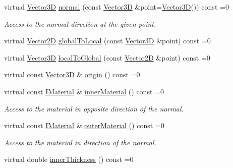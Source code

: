 \begin{DoxyCompactItemize}
\item 
virtual \hyperlink{class_d_d_surfaces_1_1_vector3_d}{Vector3D} \hyperlink{class_d_d_surfaces_1_1_i_surface_abbead4b1af2864d6d3f61270543310a0}{normal} (const \hyperlink{class_d_d_surfaces_1_1_vector3_d}{Vector3D} \&point=\hyperlink{class_d_d_surfaces_1_1_vector3_d}{Vector3D}()) const =0
\begin{DoxyCompactList}\small\item\em Access to the normal direction at the given point. \item\end{DoxyCompactList}\item 
virtual \hyperlink{class_d_d_surfaces_1_1_vector2_d}{Vector2D} \hyperlink{class_d_d_surfaces_1_1_i_surface_a0d6db86d4871584a9e72ac6018229737}{globalToLocal} (const \hyperlink{class_d_d_surfaces_1_1_vector3_d}{Vector3D} \&point) const =0
\item 
virtual \hyperlink{class_d_d_surfaces_1_1_vector3_d}{Vector3D} \hyperlink{class_d_d_surfaces_1_1_i_surface_a39651d79f7969ac7402a6e2cfc37803c}{localToGlobal} (const \hyperlink{class_d_d_surfaces_1_1_vector2_d}{Vector2D} \&point) const =0
\item 
virtual const \hyperlink{class_d_d_surfaces_1_1_vector3_d}{Vector3D} \& \hyperlink{class_d_d_surfaces_1_1_i_surface_a552cf76ca76154d0a6d9709d826b57f4}{origin} () const =0
\item 
virtual const \hyperlink{class_d_d_surfaces_1_1_i_material}{IMaterial} \& \hyperlink{class_d_d_surfaces_1_1_i_surface_a18942d2f0ea7478506765a50fa44d5e3}{innerMaterial} () const =0
\begin{DoxyCompactList}\small\item\em Access to the material in opposite direction of the normal. \item\end{DoxyCompactList}\item 
virtual const \hyperlink{class_d_d_surfaces_1_1_i_material}{IMaterial} \& \hyperlink{class_d_d_surfaces_1_1_i_surface_a49dfd8a5eef419226abc675b8d1126a5}{outerMaterial} () const =0
\begin{DoxyCompactList}\small\item\em Access to the material in direction of the normal. \item\end{DoxyCompactList}\item 
virtual double \hyperlink{class_d_d_surfaces_1_1_i_surface_ab6913582dd6c1f44df2038705ce2aea6}{innerThickness} () const =0
\item 

\end{DoxyCompactItemize}
